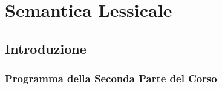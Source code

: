 \chapter{Semantica Lessicale}

\section{Introduzione}

\subsection{Programma della Seconda Parte del Corso}




